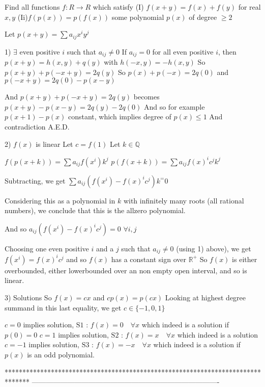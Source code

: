 \begin{solution}
	\begin{tcolorbox}Find all functions  $f:R\longrightarrow R $ which satisfy
(I) $f (x+y)=f (x)+f (y) $ for real $x,y $
(Ii)$f (p (x))=p (f (x)) $ some polynomial  $p (x) $ of degree  $\ge2$\end{tcolorbox}
Let $p(x+y)=\sum a_{ij}x^iy^j$

1) $\exists$ even positive $i$ such that $a_{ij}\ne 0$
If $a_{ij}=0$ for all even positive $i$, then 
$p(x+y)=h(x,y)+q(y)$ with $h(-x,y)=-h(x,y)$
So $p(x+y)+p(-x+y)=2q(y)$
So $p(x)+p(-x)=2q(0)$ and $p(-x+y)=2q(0)-p(x-y)$

And $p(x+y)+p(-x+y)=2q(y)$ becomes $p(x+y)-p(x-y)=2q(y)-2q(0)$
And so for example $p(x+1)-p(x)$ constant, which implies degree of $p(x)\le 1$
And contradiction
A.E.D.

2) $f(x)$ is linear
Let $c=f(1)$
Let $k\in\mathbb Q$

$f(p(x+k))=\sum a_{ij}f(x^i)k^j$
$p(f(x+k))=\sum a_{ij}f(x)^ic^jk^j$

Subtracting, we get $\sum a_{ij}(f(x^i)-f(x)^ic^j)k^=0$

Considering this as a polynomial in $k$ with infinitely many roots (all rational numbers), we conclude that this is the allzero polynomial.

And so $a_{ij}(f(x^i)-f(x)^ic^j)=0$ $\forall i,j$

Choosing one even positive $i$ and a $j$ such that $a_{ij}\ne 0$ (using 1) above), we get $f(x^i)=f(x)^ic^j$ and so $f(x)$ has a constant sign over $\mathbb R^+$
So $f(x)$ is either overbounded, either lowerbounded over an non empty open interval, and so is linear.

3) Solutions
So $f(x)=cx$ and $cp(x)=p(cx)$
Looking at highest degree summand in this last equality, we get $c\in\{-1,0,1\}$

$c=0$ implies solution, $\boxed{\text{S1 : }f(x)=0\quad\forall x}$ which indeed is a solution if $p(0)=0$
$c=1$ implies solution, $\boxed{\text{S2 : }f(x)=x\quad\forall x}$ which indeed is a solution
$c=-1$ implies solution, $\boxed{\text{S3 : }f(x)=-x\quad\forall x}$ which indeed is a solution if $p(x)$ is an odd polynomial.




\end{solution}
*******************************************************************************
-------------------------------------------------------------------------------

